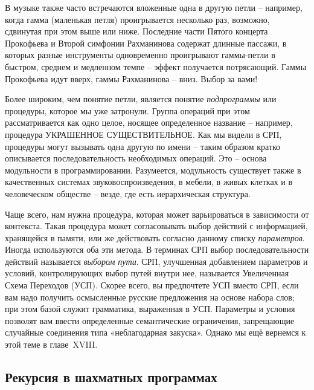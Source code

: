 \documentclass[../main.tex]{subfiles}
\begin{document}
В музыке также часто встречаются вложенные одна в другую петли \--- например, когда гамма (маленькая петля) проигрывается несколько раз, возможно, сдвинутая при этом выше или ниже. Последние части Пятого концерта Прокофьева и Второй симфонии Рахманинова содержат длинные пассажи, в которых разные инструменты одновременно проигрывают гаммы-петли в быстром, среднем и медленном темпе \--- эффект получается потрясающий. Гаммы Прокофьева идут вверх, гаммы Рахманинова \--- вниз. Выбор за вами!

Более широким, чем понятие петли, является понятие \emph{подпрограммы} или процедуры, которое мы уже затронули. Группа операций при этом рассматривается как одно целое, носящее определенное название \--- например, процедура УКРАШЕННОЕ СУЩЕСТВИТЕЛЬНОЕ\@. Как мы видели в СРП, процедуры могут вызывать одна другую по имени \--- таким образом кратко описывается последовательность необходимых операций. Это \--- основа модульности в программировании. Разумеется, модульность существует также в качественных системах звуковоспроизведения, в мебели, в живых клетках и в человеческом обществе \--- везде, где есть иерархическая структура.

Чаще всего, нам нужна процедура, которая может варьироваться в зависимости от контекста. Такая процедура может согласовывать выбор действий с информацией, хранящейся в памяти, или же действовать согласно данному списку \emph{параметров}. Иногда используются оба эти метода. В терминах СРП выбор последовательности действий называется \emph{выбором пути}. СРП, улучшенная добавлением параметров и условий, контролирующих выбор путей внутри нее, называется Увеличенная Схема Переходов (УСП). Скорее всего, вы предпочтете УСП вместо СРП, если вам надо получить осмысленные русские предложения на основе набора слов; при этом базой служит грамматика, выраженная в УСП\@. Параметры и условия позволят вам ввести определенные семантические ограничения, запрещающие случайные соединения типа «неблагодарная закуска».
Однако мы ещё вернемся к этой теме в главе~XVIII.


\subsection{Рекурсия в шахматных программах}
\end{document}
